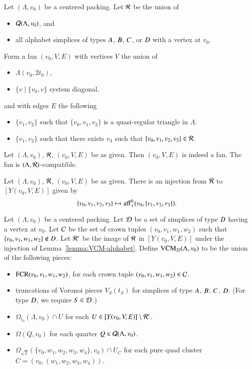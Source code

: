 Let $(\Lambda,v_0)$ be a centered packing.  Let ${\mathcal R}$ be the union of 
\begin{itemize}
  \item ${\mathcal Q}(\Lambda,v_0)$, and
  \item all alphabet simplices of types $A$, $B$, $C$, or $D$ with a vertex at $v_0$.  
\end{itemize}
Form a fan $(v_0,V,E)$ with vertices $V$ the union of
\begin{itemize}
  \item $\Lambda(v_0,2t_0)$,
  \item $\{v \mid \{v_0,v\}$  system diagonal.
\end{itemize}
and with edges $E$ the following
\begin{itemize}
  \item $\{v_1,v_2\}$ such that $\{v_0,v_1,v_2\}$ is a quasi-regular triangle in $\Lambda$.
  \item $\{v_1,v_2\}$ such that there exists $v_3$ such that $\{v_0,v_1,v_2,v_3\}\in{\mathcal R}$.
\end{itemize}

\begin{lemma}
Let $(\Lambda,v_0)$, ${\mathcal R}$, $(v_0,V,E)$ be as given. Then $(v_0,V,E)$ is indeed a fan.
The fan is $(\Lambda,{\mathcal R})$-compatible.  
\end{lemma}




\begin{lemma}
Let $(\Lambda,v_0)$, ${\mathcal R}$, $(v_0,V,E)$ be as given.  There is an injection from ${\mathcal R}$
to $[Y(v_0,V,E)]$ given by 
  $$
  \{v_0,v_1,v_2,v_3\}\mapsto {\operatorname{aff}}_+^0(v_0,\{v_1,v_2,v_3\}).
  $$
\end{lemma}

\begin{definition}[VCM]
Let $(\Lambda,v_0)$ be  a centered packing.   
Let ${\mathcal D}$ be a set of simplices of type $D$ having a vertex at $v_0$.  Let ${\mathcal C}$ be the
set of crown tuples $(v_0,v_1,w_1,w_2)$ such that $\{v_0,v_1,w_1,w_2\}\not\in D$. 
Let ${\mathcal R}'$ be the image
of ${\mathcal R}$ in $[Y(v_0,V,E)]$ under the injection of Lemma~\ref{lemma:VCM-alphabet}.
Define ${\operatorname{VCM}}_{{\mathcal D}}(\Lambda,v_0)$ to be the union of the following pieces:
    \begin{itemize}
    \item ${\operatorname{FCR}}(v_0,v_1,w_1,w_2)$, for each crown tuple $(v_0,v_1,w_1,w_2)\in{\mathcal C}$.
    \item truncations of Voronoi pieces $V_S(t_S)$ for simplices of type
        $A$, $B$,  $C$, $D$.  (For type $D$, we require $S\in {\mathcal D}$.)
    \item $\Omega_{t_0}(\Lambda,v_0)\cap U$ for each $U\in[Y(v_0,V,E)]\setminus {\mathcal R}'$.
    \item $\Omega(Q,v_0)$ for each quarter $Q\in{\mathcal Q}(\Lambda,v_0)$.
    \item $\Omega_{\sqrt2}(\{v_0,w_1,w_2,w_3,w_4\},v_0)\cap U_C$ 
     for each pure quad
     cluster $C=(v_0,(w_1,w_2,w_3,w_4))$.
    \end{itemize}
\end{definition}

